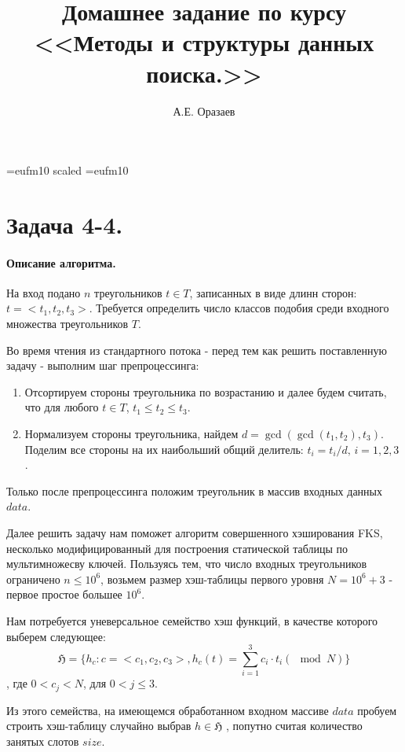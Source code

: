 \documentclass[12pt]{article}
\title{\bf Домашнее задание по курсу \\ <<Методы
и структуры данных поиска.>>}
\author{А.Е. Оразаев}
\date{}
\begin{document}
\voffset=-20mm
\hoffset=-12mm
\font\Got=eufm10 scaled \font\Got=eufm10

\maketitle

\section{Задача 4-4.}
\paragraph{Описание алгоритма.}
На вход подано $ n $ треугольников $ t \in T $, записанных
в виде длинн сторон: $ t = <t_1, t_2, t_3> $. Требуется определить
число классов подобия среди входного множества треугольников $ T $.

Во время чтения из стандартного потока - перед тем как решить
поставленную задачу - выполним шаг препроцессинга:
\begin{enumerate}
    \item Отсортируем стороны треугольника по возрастанию и далее
          будем считать, что для любого $ t \in T $, $ t_1 \le t_2 \le t_3 $.

    \item Нормализуем стороны треугольника, найдем
          $ d = \gcd(\gcd(t_1, t_2), t_3) $. Поделим все стороны на их
          наибольший общий делитель: $ t_i = t_i / d \mbox{, } i = 1, 2, 3 $.

\end{enumerate}

Только после препроцессинга положим треугольник в массив входных данных
$ data $.

Далее решить задачу нам поможет алгоритм совершенного хэширования FKS,
несколько модифицированный для построения статической таблицы по мультимножесву
ключей.
Пользуясь тем, что число входных треугольников ограничено $ n \le 10^6 $,
возьмем размер хэш-таблицы первого уровня $ N = 10^6 + 3 $ - первое простое
большее $ 10^6 $.

Нам потребуется уневерсальное семейство хэш функций, в качестве которого
выберем следующее:
$$
\mathfrak{H} = \{ h_c: c = <c_1, c_2, c_3>,
h_c(t) = \sum_{i=1}^3 c_i \cdot t_i (\mod N) \}
$$
, где $ 0 < c_j < N $, для $  0 < j \le 3 $.

Из этого семейства, на имеющемся обработанном входном массиве $ data $
пробуем строить хэш-таблицу случайно выбрав $ h \in \mathfrak{H} $
, попутно считая количество занятых слотов $ size $.
\end{document}
